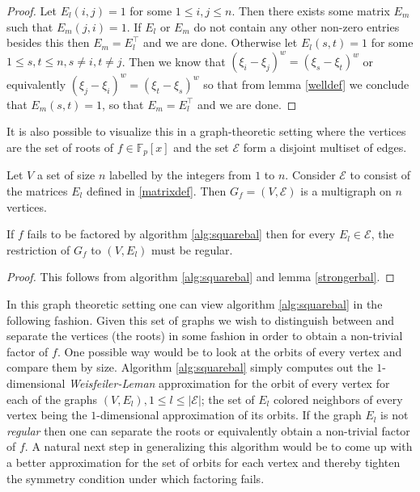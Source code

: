 \begin{proof}
	Let  $E_l(i,j)=1$ for some $1 \le i,j \le n$. Then there exists some matrix $E_m$ such that $E_m(j,i)=1$. If $E_l$ or $E_m$ do not contain any other non-zero entries besides this then $E_m=E_l^\top$ and we are done.
	Otherwise let $E_l(s,t)=1$ for some $1 \le s,t \le n,s\neq i,t\neq j$. Then we know that $(\xi_i-\xi_j)^w=(\xi_s-\xi_t)^w$ or equivalently $(\xi_j-\xi_i)^w=(\xi_t-\xi_s)^w$ so that from lemma \ref{welldef} we conclude that 
	$E_m(s,t)=1$, so that $E_m=E_l^\top$ and we are done.
\end{proof}


It is also possible to visualize this in a graph-theoretic setting where the vertices
are the set of roots of $f \in \mathbb{F}_p[x]$ and the set $\mathcal{E}$ form a disjoint multiset of edges.

\begin{definition}\label{multigraph}
	Let $V$ a set of size $n$ labelled by the integers from $1$ to $n$. Consider $\mathcal{E}$ to consist of the matrices $E_l$ defined in \ref{matrixdef}. Then $G_f=(V,\mathcal{E})$ is a multigraph on $n$ vertices.
\end{definition}

\begin{lemma}
      If $f$ fails to be factored by algorithm \ref{alg:squarebal} then for every $E_l \in \mathcal{E}$, the restriction of $G_f$ to $(V,E_l)$ must be regular.
\end{lemma}

\begin{proof}
	This follows from algorithm \ref{alg:squarebal} and lemma \ref{strongerbal}.
\end{proof}


In this graph theoretic setting one can view algorithm \ref{alg:squarebal} in the following fashion. Given this set of graphs we wish to distinguish between and separate the vertices (the roots) in some fashion in order to obtain
a non-trivial
factor of $f$. One possible way would be to look at the orbits of every vertex and compare them by size. Algorithm \ref{alg:squarebal} simply computes out the $1$-dimensional \emph{Weisfeiler-Leman} approximation for the orbit 
of every vertex for each of the graphs $(V,E_l), 1 \le l \le |\mathcal{E}|$; the set of $E_l$ colored neighbors of every vertex being the $1$-dimensional approximation of its orbits. If the graph $E_l$ is not \emph{regular} then
one can separate the roots or equivalently obtain a non-trivial factor of $f$. A natural next step in generalizing this 
algorithm would be to come up with a better approximation for the set of orbits for each vertex and thereby tighten the symmetry condition under which factoring fails. 

